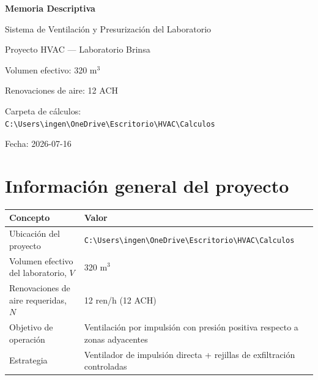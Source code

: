 \documentclass[12pt,a4paper]{article}
\begin{document}
\begin{titlepage}
    \centering
    \vspace*{2cm}
    {\Huge\bfseries\color{azuloscuro} Memoria Descriptiva}\par
    \vspace{0.5cm}
    {\LARGE Sistema de Ventilación y Presurización del Laboratorio}\par
    \vspace{2cm}
    {\Large Proyecto HVAC --- Laboratorio Brinsa}\par
    \vspace{1cm}
    {\large Volumen efectivo: 320 m$^3$}\par
    {\large Renovaciones de aire: 12 ACH}\par
    \vfill
    {\large Carpeta de cálculos:\\ \footnotesize\texttt{C:\textbackslash Users\textbackslash ingen\textbackslash OneDrive\textbackslash Escritorio\textbackslash HVAC\textbackslash Calculos}}\par
    \vspace{1cm}
    {\large Fecha: 2026-07-16}
\end{titlepage}

\tableofcontents
\newpage

\section{Información general del proyecto}

\begin{table}[h!]
\centering
{}
\begin{tabular}{@{}p{6cm}p{8.5cm}@{}}
\toprule
\textbf{Concepto} & \textbf{Valor} \\
\midrule
Ubicación del proyecto & {\footnotesize\texttt{C:\textbackslash Users\textbackslash ingen\textbackslash OneDrive\textbackslash Escritorio\textbackslash HVAC\textbackslash Calculos}} \\
Volumen efectivo del laboratorio, $V$ & 320 m$^3$ \\
Renovaciones de aire requeridas, $N$ & 12 ren/h (12 ACH) \\
Objetivo de operación & Ventilación por impulsión con presión positiva respecto a zonas adyacentes \\
Estrategia & Ventilador de impulsión directa + rejillas de exfiltración controladas \\
\bottomrule
\end{tabular}
\end{table}
\end{document}
